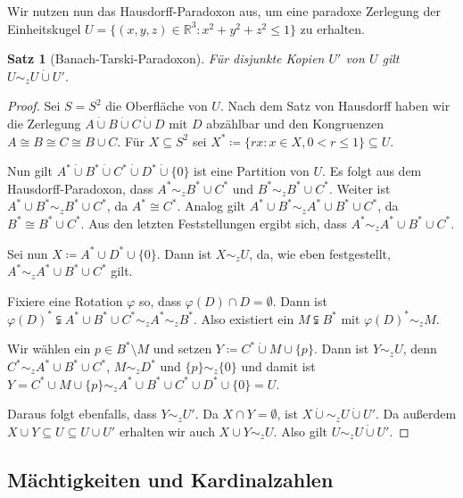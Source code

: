 \documentclass[german]{article}
\theoremstyle{break}
\theoremstyle{def_style}
\theoremstyle{def_style}
\newtheorem{satz}{Satz}[section]
\theoremstyle{lemma_style}
\begin{document}
Wir nutzen nun das Hausdorff-Paradoxon aus, um eine paradoxe Zerlegung der Einheitskugel $U=\{(x,y,z)\in\mathbb{R}^3 : x^2+y^2+z^2\leq 1\}$ zu erhalten.

\begin{satz}[Banach-Tarski-Paradoxon]
	Für disjunkte Kopien $U'$ von $U$ gilt $U\sim_z U\dot{\cup} U'$.
\end{satz}
\begin{proof}
	Sei $S=S^2$ die Oberfläche von $U$. Nach dem Satz von Hausdorff haben wir die Zerlegung $A\dot{\cup}B\dot{\cup}C\dot{\cup}D$ mit $D$ abzählbar und den Kongruenzen $A\cong B\cong C\cong B\cup C$. Für $X\subseteq S^2$ sei $X^\ast\coloneqq\{rx:x\in X, 0<r\leq 1\}\subseteq U$.
	
	Nun gilt $A^\ast \dot{\cup} B^\ast \dot{\cup} C^\ast \dot{\cup} D^\ast \dot{\cup} \{0\}$ ist eine Partition von $U$. Es folgt aus dem Hausdorff-Paradoxon, dass $A^\ast\sim_z B^\ast\cup C^\ast$ und $B^\ast\sim_z B^\ast\cup C^\ast$. Weiter ist $A^\ast\cup B^\ast\sim_z B^\ast \cup C^\ast$, da $A^\ast\cong C^\ast$. Analog gilt $A^\ast\cup B^\ast \sim_z A^\ast \cup B^\ast \cup C^\ast$, da $B^\ast\cong B^\ast\cup C^\ast$. Aus den letzten Feststellungen ergibt sich, dass $A^\ast\sim_z A^\ast\cup B^\ast \cup C^\ast$.
	
	Sei nun $X\coloneqq A^\ast \cup D^\ast \cup \{0\}$. Dann ist $X\sim_z U$, da, wie eben festgestellt, $A^\ast \sim_z A^\ast \cup B^\ast \cup C^\ast$ gilt.
	
	Fixiere eine Rotation $\varphi$ so, dass $\varphi(D)\cap D =\emptyset$. Dann ist $\varphi(D)^\ast\subsetneqq A^\ast\cup B^\ast\cup C^\ast \sim_z A^\ast \sim_z B^\ast$. Also existiert ein $M\subsetneqq B^\ast$ mit $\varphi(D)^\ast\sim_z M$.
	
	Wir wählen ein $p\in B^\ast\setminus M$ und setzen $Y\coloneqq C^\ast \dot{\cup} M \cup \{p\}$. Dann ist $Y\sim_z U$, denn $C^\ast \sim_z A^\ast \cup B^\ast \cup C^\ast$, $M\sim_z D^\ast$ und $\{p\}\sim_z\{0\}$ und damit ist $Y=C^\ast\cup M\cup\{p\}\sim_zA^\ast\cup B^\ast \cup C^\ast \cup D^\ast \cup \{0\}=U$.
	
	Daraus folgt ebenfalls, dass $Y\sim_z U'$. Da $X\cap Y=\emptyset$, ist $X\dot{\cup}\sim_z U\dot{\cup} U'$. Da außerdem $X\cup Y\subseteq U \subseteq U\cup U'$ erhalten wir auch $X\cup Y \sim_z U$. Also gilt $U\sim_z U\dot{\cup} U'$.
\end{proof}

\subsection{Mächtigkeiten und Kardinalzahlen}
\end{document}
